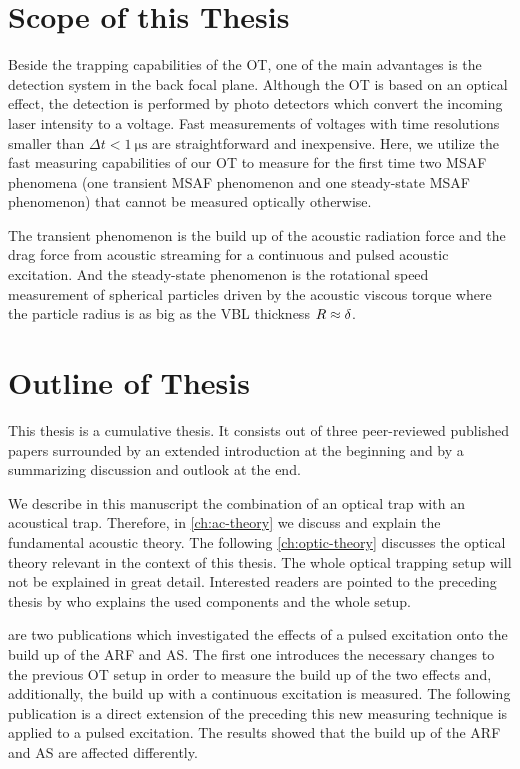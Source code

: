 \section{Scope of this Thesis}

Beside the trapping capabilities of the OT, one of the main advantages is the 
detection system in the back focal plane. Although the OT is based on an 
optical effect, the detection is performed by photo detectors which convert the 
incoming laser intensity to a voltage. Fast measurements of voltages with time 
resolutions smaller than $\Delta t < \SI{1}{\us}$ are straightforward and 
inexpensive. Here, we utilize the fast measuring capabilities of our OT to 
measure for the first time two MSAF phenomena (one transient MSAF phenomenon 
and one steady-state MSAF phenomenon) that cannot be measured optically 
otherwise.

The transient phenomenon is the build up of the acoustic radiation force and 
the drag force from acoustic streaming for a continuous and pulsed acoustic 
excitation. And the steady-state phenomenon is the rotational speed 
measurement of spherical particles driven by the acoustic viscous torque where 
the particle radius is as big as the VBL thickness $R\approx\delta$.

\section{Outline of Thesis\label{sec:I-outline}}

This thesis is a cumulative thesis. It consists out of three peer-reviewed 
published papers surrounded by an extended introduction at the beginning and by 
a summarizing discussion and outlook at the end.

We describe in this manuscript the combination of an optical trap with an 
acoustical trap. Therefore, in \cref{ch:ac-theory} we discuss and explain the 
fundamental acoustic theory. The following \cref{ch:optic-theory} discusses the 
optical theory relevant in the context of this thesis. The whole optical 
trapping setup will not be explained in great detail. Interested readers are 
pointed to the preceding thesis by  who explains the used 
components and the whole setup.

 are two publications which investigated the 
effects of a pulsed excitation onto the build up of the ARF and AS. The first 
one introduces the necessary changes to the previous OT setup in order to 
measure the build up of the two effects and, additionally, the build up with a 
continuous excitation is measured. The following publication is a direct 
extension of the preceding this new measuring technique is applied to a pulsed 
excitation. The results showed that the build up of the ARF and AS are affected 
differently.

